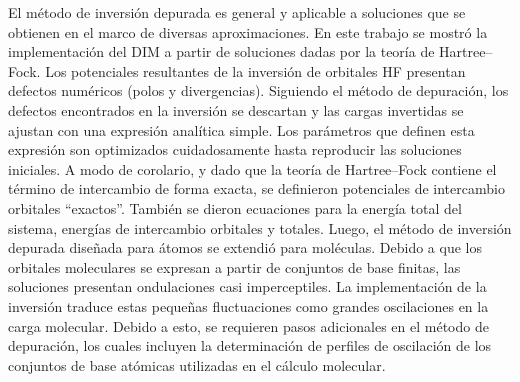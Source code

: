 El método de inversión depurada es general y aplicable a soluciones que 
se obtienen en el marco de diversas aproximaciones. En este trabajo se 
mostró la implementación del DIM a partir de soluciones dadas por la 
teoría de Hartree--Fock. Los potenciales resultantes de la inversión de 
orbitales HF presentan defectos numéricos (polos y divergencias).
Siguiendo el método de depuración, los defectos encontrados en la 
inversión se descartan y las cargas invertidas se ajustan con una 
expresión analítica simple. Los parámetros que definen esta expresión 
son optimizados cuidadosamente hasta reproducir las soluciones iniciales.
A modo de corolario, y dado que la teoría de Hartree--Fock contiene el 
término de intercambio de forma exacta, se definieron potenciales de 
intercambio orbitales ``exactos''. También se dieron ecuaciones para la 
energía total del sistema, energías de intercambio orbitales y totales.
Luego, el método de inversión depurada diseñada para átomos se extendió 
para moléculas. Debido a que los orbitales moleculares se expresan a 
partir de conjuntos de base finitas, las soluciones presentan 
ondulaciones casi imperceptiles. La implementación de la inversión 
traduce estas pequeñas fluctuaciones como grandes oscilaciones en la 
carga molecular. Debido a esto, se requieren pasos adicionales en el 
método de depuración, los cuales incluyen la determinación de perfiles 
de oscilación de los conjuntos de base atómicas utilizadas en el cálculo 
molecular. 

